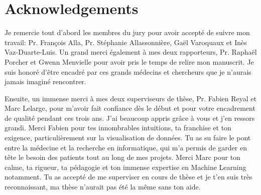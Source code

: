 \chapter*{Acknowledgements}

Je remercie tout d'abord les membres du jury pour avoir accepté de suivre mon
travail: Pr. François Alla, Pr. Stéphanie Allassonnière, Gaël Varoquaux et Inès
Vaz-Duarte-Luis. Un grand merci également à mes deux rapporteurs, Pr. Raphaël
Porcher et Gwenn Menvielle pour avoir pris le temps de relire mon manuscrit. Je
suis honoré d'être encadré par ces grands médecins et chercheurs que je n'aurais
jamais imaginé rencontrer.

Ensuite, un immense merci à mes deux superviseurs de thèse, Pr. Fabien Reyal et
Marc Lelarge, pour m'avoir fait confiance dès le début et pour votre encadrement
de qualité pendant ces trois ans. J'ai beaucoup appris grâce à vous et j'en
ressors grandi. Merci Fabien pour tes innombrables intuitions, ta franchise et
ton exigence, particulièrement sur la visualisation de données. Tu as su faire
le pont entre la médecine et la recherche en informatique, qui m'a permis de
garder en tête le besoin des patients tout au long de mes projets. Merci Marc
pour ton calme, ta rigueur, ta pédagogie et ton immense expertise en Machine
Learning notamment. Tu as accepté de me superviser en cours de thèse et je t'en
suis très reconnaissant, ma thèse n'aurait pas été la même sans ton aide.

